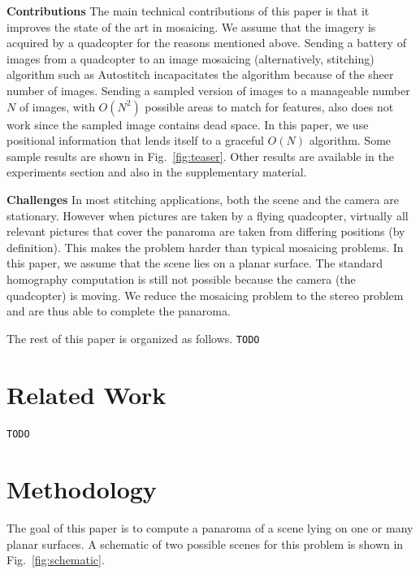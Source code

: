 \documentclass[10pt,twocolumn,letterpaper]{article}
\begin{document}
{\bf Contributions} The main technical contributions of this paper is
that it improves the state of the art in mosaicing.  We assume that
the imagery is acquired by a quadcopter for the reasons mentioned
above. Sending a battery of images from a quadcopter to an image
mosaicing (alternatively, stitching) algorithm such as Autostitch
incapacitates the algorithm because of the sheer number of
images. Sending a sampled version of images to a manageable number $N$
of images, with $O(N^2)$ possible areas to match for features, also
does not work since the sampled image contains dead space.  In this
paper, we use positional information that lends itself to a graceful
$O(N)$ algorithm.  Some sample results are shown in Fig.~\ref{fig:teaser}.
Other results are available in the experiments section and also in the
supplementary material.

{\bf Challenges} In most stitching applications, both the scene and
the camera are stationary.  However when pictures are taken by a
flying quadcopter, virtually all relevant pictures that cover the
panaroma are taken from differing positions (by definition).  This
makes the problem harder than typical mosaicing problems.  In this
paper, we assume that the scene lies on a planar surface. The standard
homography computation is still not possible because the camera (the
quadcopter) is moving. We reduce the mosaicing problem to the stereo
problem and are thus able to complete the panaroma.

The rest of this paper is organized as follows.
\verb+TODO+

\section{Related Work}
\verb+TODO+

\section{Methodology}

The goal of this paper is to compute a panaroma of a scene lying on
one or many planar surfaces.  A schematic of two possible scenes for
this problem is shown in Fig.~\ref{fig:schematic}.
\end{document}
